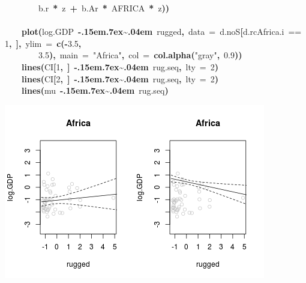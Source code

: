 \documentclass{article}
\makeatletter
\newcommand{\hlnumber}[1]{\textcolor[rgb]{0,0,0}{#1}}%
\newcommand{\hlfunctioncall}[1]{\textcolor[rgb]{.5,0,.33}{\textbf{#1}}}%
\newcommand{\hlstring}[1]{\textcolor[rgb]{.6,.6,1}{#1}}%
\newcommand{\hlkeyword}[1]{\textbf{#1}}%
\newcommand{\hlargument}[1]{\textcolor[rgb]{.69,.25,.02}{#1}}%
\newcommand{\hlsymbol}[1]{#1}%
\def\urltilda{\kern -.15em\lower .7ex\hbox{\~{}}\kern .04em}%
\newcommand{\hlstd}[1]{\textcolor[rgb]{0,0,0}{#1}}%
\newenvironment{kframe}{%
 \def\FrameCommand##1{\hskip\@totalleftmargin \hskip-\fboxsep
 \colorbox{shadecolor}{##1}\hskip-\fboxsep
     \hskip-\linewidth \hskip-\@totalleftmargin \hskip\columnwidth}%
 \MakeFramed {\advance\hsize-\width
   \@totalleftmargin\z@ \linewidth\hsize
   \@setminipage}}%
 {\par\unskip\endMakeFramed}
\newenvironment{knitrout}{}{} %
\makeatother
\begin{document}
\begin{knitrout}
{\begin{kframe}
\begin{flushleft}
\hlstd{}{\ }{\ }{\ }{\ }{\ }{\ }{\ }{\ }\hlsymbol{b.r}{\ }\hlkeyword{*}{\ }\hlsymbol{z}{\ }\hlkeyword{+}{\ }\hlsymbol{b.Ar}{\ }\hlkeyword{*}{\ }\hlsymbol{AFRICA}{\ }\hlkeyword{*}{\ }\hlsymbol{z}\hlkeyword{)}\hlkeyword{)}\hspace*{\fill}\\
\hlstd{}\hspace*{\fill}\\
\hlstd{}{\ }{\ }{\ }{\ }\hlfunctioncall{plot}\hlkeyword{(}\hlsymbol{log.GDP}{\ }\hlkeyword{\urltilda{}}{\ }\hlsymbol{rugged}\hlkeyword{,}{\ }\hlargument{data}{\ }\hlargument{=}{\ }\hlsymbol{d.noS}\hlkeyword{[}\hlsymbol{d.rc}\hlkeyword{\usebox{\hlnormalsizeboxdollar}}\hlsymbol{Africa.i}{\ }=={\ }\hlnumber{1}\hlkeyword{,}{\ }\hlkeyword{]}\hlkeyword{,}{\ }\hlargument{ylim}{\ }\hlargument{=}{\ }\hlfunctioncall{c}\hlkeyword{(}\hlkeyword{-}\hlnumber{3.5}\hlkeyword{,}\hspace*{\fill}\\
\hlstd{}{\ }{\ }{\ }{\ }{\ }{\ }{\ }{\ }\hlnumber{3.5}\hlkeyword{)}\hlkeyword{,}{\ }\hlargument{main}{\ }\hlargument{=}{\ }\hlstring{"Africa"}\hlkeyword{,}{\ }\hlargument{col}{\ }\hlargument{=}{\ }\hlfunctioncall{col.alpha}\hlkeyword{(}\hlstring{"gray"}\hlkeyword{,}{\ }\hlnumber{0.9}\hlkeyword{)}\hlkeyword{)}\hspace*{\fill}\\
\hlstd{}{\ }{\ }{\ }{\ }\hlfunctioncall{lines}\hlkeyword{(}\hlsymbol{CI}\hlkeyword{[}\hlnumber{1}\hlkeyword{,}{\ }\hlkeyword{]}{\ }\hlkeyword{\urltilda{}}{\ }\hlsymbol{rug.seq}\hlkeyword{,}{\ }\hlargument{lty}{\ }\hlargument{=}{\ }\hlnumber{2}\hlkeyword{)}\hspace*{\fill}\\
\hlstd{}{\ }{\ }{\ }{\ }\hlfunctioncall{lines}\hlkeyword{(}\hlsymbol{CI}\hlkeyword{[}\hlnumber{2}\hlkeyword{,}{\ }\hlkeyword{]}{\ }\hlkeyword{\urltilda{}}{\ }\hlsymbol{rug.seq}\hlkeyword{,}{\ }\hlargument{lty}{\ }\hlargument{=}{\ }\hlnumber{2}\hlkeyword{)}\hspace*{\fill}\\
\hlstd{}{\ }{\ }{\ }{\ }\hlfunctioncall{lines}\hlkeyword{(}\hlsymbol{mu}{\ }\hlkeyword{\urltilda{}}{\ }\hlsymbol{rug.seq}\hlkeyword{)}\hspace*{\fill}\\
\hlstd{}\hlkeyword{\usebox{\hlnormalsizeboxclosebrace}}\mbox{}
\normalfont
\end{flushleft}
\includegraphics{no-sey} \begin{flushleft}

\end{flushleft}
\end{kframe}}
\end{knitrout}
\end{document}
